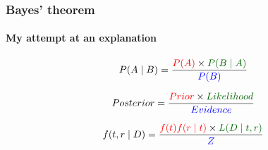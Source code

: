 
\begin{frame}
  \frametitle{Bayes' theorem}
  \framesubtitle{My attempt at an explanation\footnotemark}

  \begin{equation} \label{eq:bayes_standard}
  P(A \mid B) = \frac{{\color{red}P(A)} \times {\color{darkgreen}P(B \mid A)}}{{\color{blue}P(B)}}
  \end{equation}
  \newline

  \begin{equation} \label{eq:bayes_english}
  Posterior = \frac{{\color{red}Prior} \times {\color{darkgreen}Likelihood}}{{\color{blue}Evidence}}
  \end{equation}
  \newline

  \begin{equation} \label{eq:bayes_phylo}
  f(t, r \mid D) = \frac{{\color{red}f(t)f(r \mid t)} \times {\color{darkgreen}L(D \mid t, r)}}{{\color{blue}Z}}
  \end{equation}
  \newline


\end{frame}
